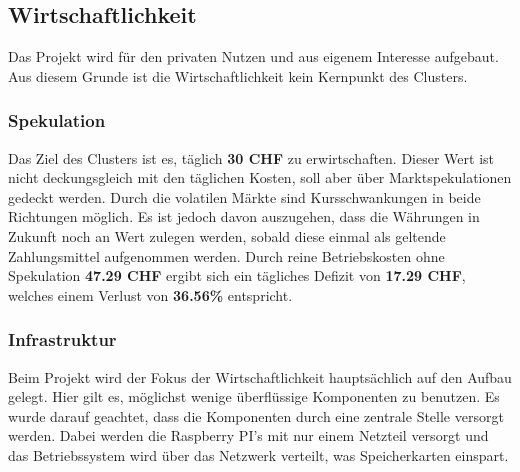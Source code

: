 
\subsection{Wirtschaftlichkeit}
Das Projekt wird für den privaten Nutzen und aus eigenem Interesse aufgebaut. Aus diesem Grunde ist die Wirtschaftlichkeit kein Kernpunkt des Clusters.

\subsubsection{Spekulation}
Das Ziel des Clusters ist es, täglich \textbf{30 CHF} zu erwirtschaften. Dieser Wert ist nicht deckungsgleich mit den täglichen Kosten, soll aber über Marktspekulationen gedeckt werden. Durch die volatilen Märkte sind Kursschwankungen in beide Richtungen möglich. Es ist jedoch davon auszugehen, dass die Währungen in Zukunft noch an Wert zulegen werden, sobald diese einmal als geltende Zahlungsmittel aufgenommen werden. Durch reine Betriebskosten ohne Spekulation \textbf{47.29 CHF} ergibt sich ein tägliches Defizit von \textbf{17.29 CHF}, welches einem Verlust von \textbf{36.56\%} entspricht.

\subsubsection{Infrastruktur}
Beim Projekt wird der Fokus der Wirtschaftlichkeit hauptsächlich auf den Aufbau gelegt. Hier gilt es, möglichst wenige überflüssige Komponenten zu benutzen. Es wurde darauf geachtet, dass die Komponenten durch eine zentrale Stelle versorgt werden. Dabei werden die Raspberry PI's mit nur einem Netzteil versorgt und das Betriebssystem wird über das Netzwerk verteilt, was Speicherkarten einspart.

